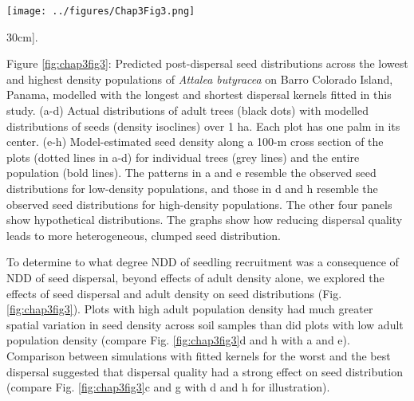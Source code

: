\documentclass[b5paper,justified]{tufte-book} %
\begin{document}
\begin{fullwidth}
\begin{landscape}
\thispagestyle{lscape}
\pagestyle{lscape}
\begin{figure*}
\hspace{5.5cm} \texttt{[image: ../figures/Chap3Fig3.png]}
\caption[Predicted post-dispersal seed distributions][30cm]{.}
\label{fig:chap3fig3}
\hspace*{5cm}\begin{minipage}{20cm}
\small Figure \ref{fig:chap3fig3}: Predicted post-dispersal seed distributions across the lowest and highest density populations of \textit{Attalea butyracea} on Barro Colorado Island, Panama, modelled with the longest and shortest dispersal kernels fitted in this study. (a-d) Actual distributions of adult trees (black dots) with modelled distributions of seeds (density isoclines) over 1 ha. Each plot has one palm in its center. (e-h) Model-estimated seed density along a 100-m cross section of the plots (dotted lines in a-d) for individual trees (grey lines) and the entire population (bold lines). The patterns in a and e resemble the observed seed distributions for low-density populations, and those in d and h resemble the observed seed distributions for high-density populations. The other four panels show hypothetical distributions. The graphs show how reducing dispersal quality leads to more heterogeneous, clumped seed distribution.
\end{minipage} 
\end{figure*}
\end{landscape}

To determine to what degree NDD of seedling recruitment was a consequence of NDD of seed dispersal, beyond effects of adult density alone, we explored the effects of seed dispersal and adult density on seed distributions (Fig. \ref{fig:chap3fig3}). Plots with high adult population density had much greater spatial variation in seed density across soil samples than did plots with low adult population density (compare Fig. \ref{fig:chap3fig3}d and h with a and e). Comparison between simulations with fitted kernels for the worst and the best dispersal suggested that dispersal quality had a strong effect on seed distribution (compare Fig. \ref{fig:chap3fig3}c and g with d and h for illustration).


\end{fullwidth}
\end{document}
